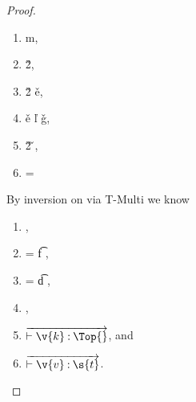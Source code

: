 \begin{lemma}
\begin{proof}
\begin{case}[T-App]
\begin{itemize}
\begin{subcase}[B-BetaMulti]
  \begin{enumerate}
    \item
  \opsem {\openv{}}
         {}
         { {m}},
    \item
  \opsem {\openv{}}
         {}
         {\v{2}},
    \item
  \opsem {\openv{}}
         { {\v{2}}}
         {\v{e}},
    \item
  \getmethod {\disptable{}}
             {\v{e}}
             {\v{l}}
             {\v{g}},
    \item
  \opsem {\openv{}}
         { {\v{2}}}
         {\v{}},
       \item {\disptable{}} = {}
     \end{enumerate}

     By inversion on  via T-Multi we know 
     \begin{enumerate}[resume]
       \item
                {
                            {}}
                {},
           
         \item {} = {\ArrowOne {\x{}} {\s{}}
                                                       {\t{f}}
                                                       {
                                                                   {}}
                                                       {}},
         \item {} = {\ArrowOne {\x{}} {\s{}}
                                                       {\t{d}}
                                                       {
                                                                   {}}
                                                       {}},
       \item
                {
                            {}}
                {},
              \item
  $\overrightarrow{\judgementtwo{}{\v{k}}{\Top{}}}$, and 
\item
  $\overrightarrow{\judgementtwo{}{\v{v}}{\s{t}}}$.
  \end{enumerate}


\end{subcase}
\end{itemize}
\end{case}
\end{proof}
\end{lemma}
